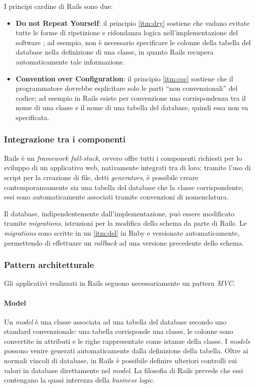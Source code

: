 I principi cardine di Rails sono due:
\begin{itemize}
    \item\textbf{Do not Repeat Yourself}: il principio \ref{itm:dry} sostiene che vadano evitate tutte le forme di ripetizione e ridondanza logica nell'implementazione del software \cite{DBLP:journals/corr/abs-1210-0530}; ad esempio, non è necessario specificare le colonne della tabella del database nella definizione di una classe, in quanto Rails recupera automaticamente tale informazione.
    \item\textbf{Convention over Configuration}: il principio \ref{itm:coc} sostiene che il programmatore dovrebbe esplicitare solo le parti ``non convenzionali'' del codice; ad esempio in Rails esiste per convenzione una corrispondenza tra il nome di una classe e il nome di una tabella del database, quindi essa non va specificata.
\end{itemize}
\vspace{-25pt}
\subsubsection{Integrazione tra i componenti}
Rails è un \textit{framework full-stack}, ovvero offre tutti i componenti richiesti per lo sviluppo di un applicativo web, nativamente integrati tra di loro: tramite l'uso di script per la creazione di file, detti \textit{generators}, è possibile creare contemporaneamente sia una tabella del database che la classe corrispondente; essi sono automaticamente associati tramite convenzioni di nomenclatura. 

Il database, indipendentemente dall'implementazione, può essere modificato tramite \textit{migrations}, istruzioni per la modifica dello schema da parte di Rails. Le \textit{migrations} sono scritte in un \ref{itm:dsl} in Ruby e versionate automaticamente, permettendo di effettuare un \textit{rollback} ad una versione precedente dello schema.
 
\subsubsection{Pattern architetturale}
Gli applicativi realizzati in Rails seguono necessariamente un pattern \textit{MVC}.
\paragraph{Model}
Un \textit{model} è una classe associata ad una tabella del database secondo uno standard convenzionale: una tabella corrisponde una classe, le colonne sono convertite in attributi e le righe rappresentate come istanze della classe. I \textit{models} possono venire generati automaticamente dalla definizione della tabella. Oltre ai normali vincoli di database, in Rails è possibile definire ulteriori controlli sui valori in database direttamente nel \textit{model}. La filosofia di Rails prevede che essi contengano la quasi interezza della \textit{business logic}.

